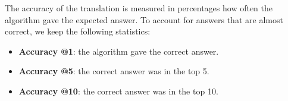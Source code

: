 The accuracy of the translation is measured in percentages how often the algorithm gave the expected answer. To account for answers that are almost correct, we keep the following statistics:
\begin{itemize}
	\item \textbf{Accuracy @1}: the algorithm gave the correct answer.
	\item \textbf{Accuracy @5}: the correct answer was in the top 5.
	\item \textbf{Accuracy @10}: the correct answer was in the top 10.
\end{itemize}
